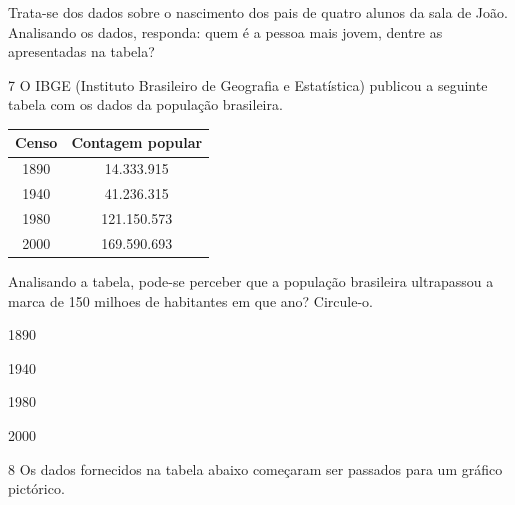 Trata-se dos dados sobre o nascimento dos pais de quatro alunos da sala
de João. Analisando os dados, responda: quem é a pessoa mais jovem,
dentre as apresentadas na tabela?


\num{7} O IBGE (Instituto Brasileiro de Geografia e Estatística) publicou a
seguinte tabela com os dados da população brasileira.

\begin{center}
\begin{tabular}{c|c}
\hline
\multicolumn{1}{l|}{Censo} & \multicolumn{1}{l}{Contagem popular} \\ \hline
1890 & 14.333.915 \\ \hline
1940 & 41.236.315 \\ \hline
1980 & 121.150.573 \\ \hline
2000 & 169.590.693 \\ \hline
\end{tabular}
\end{center}

Analisando a tabela, pode-se perceber que a população brasileira
ultrapassou a marca de 150 milhoes de habitantes em que ano? Circule-o.

\begin{escolha}
\item
  1890
\item
  1940
\item
  1980
\item
  2000
\end{escolha}


\pagebreak
\num{8} Os dados fornecidos na tabela abaixo começaram ser passados para um
gráfico pictórico.

